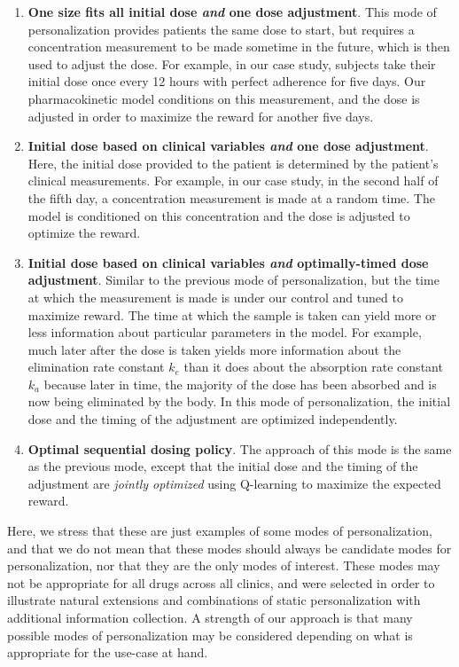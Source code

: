 \begin{enumerate}
	\item \textbf{One size fits all initial dose \textit{and} one dose adjustment}.  This mode of personalization provides patients the same dose to start, but requires a concentration measurement to be made sometime in the future, which is then used to adjust the dose.  For example, in our case study, subjects take their initial dose once every 12 hours with perfect adherence for five days.  Our pharmacokinetic model conditions on this measurement, and the dose is adjusted in order to maximize the reward for another five days.
	
	\item \textbf{Initial dose based on clinical variables \textit{and} one dose adjustment}.  Here, the initial dose provided to the patient is determined by the patient's clinical measurements. For example, in our case study, in the second half of the fifth day, a concentration measurement is made at a random time. The model is conditioned on this concentration and the dose is adjusted to optimize the reward.
	
	\item \textbf{Initial dose based on clinical variables \textit{and} optimally-timed dose adjustment}.  Similar to the previous mode of personalization, but the time at which the measurement is made is under our control and tuned to maximize reward. The time at which the sample is taken can yield more or less information about particular parameters in the model. For example, much later after the dose is taken yields more information about the elimination rate constant $k_e$ than it does about the absorption rate constant $k_a$ because later in time, the majority of the dose has been absorbed and is now being eliminated by the body. In this mode of personalization, the initial dose and the timing of the adjustment are optimized independently. 
	
	\item \textbf{Optimal sequential dosing policy}. The approach of this mode is the same as the previous mode, except that the initial dose and the timing of the adjustment are \textit{jointly optimized} using Q-learning to maximize the expected reward.
\end{enumerate}

Here, we stress that these are just examples of some modes of personalization, and that we do not mean that these modes should always be candidate modes for personalization, nor that they are the only modes of interest.  These modes may not be appropriate for all drugs across all clinics, and were selected in order to illustrate natural extensions and combinations of static personalization with additional information collection. A strength of our approach is that many possible modes of personalization may be considered depending on what is appropriate for the use-case at hand.


